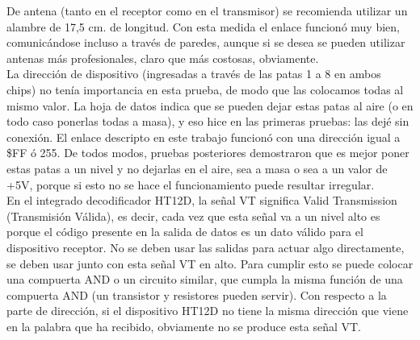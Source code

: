 \documentclass[a4paper,11pt]{article}
\begin{document}
De antena (tanto en el receptor como en el transmisor) se recomienda utilizar un alambre de 17,5 cm. de longitud. Con esta medida el enlace funcionó muy bien, comunicándose incluso a través de paredes, aunque si se desea se pueden utilizar antenas más profesionales, claro que más costosas, obviamente. \\

La dirección de dispositivo (ingresadas a través de las patas 1 a 8 en ambos chips) no tenía importancia en esta prueba, de modo que las colocamos todas al mismo valor. La hoja de datos indica que se pueden dejar estas patas al aire (o en todo caso ponerlas todas a masa), y eso hice en las primeras pruebas: las dejé sin conexión. El enlace descripto en este trabajo funcionó con una dirección igual a \$FF ó 255. De todos modos, pruebas posteriores demostraron que es mejor poner estas patas a un nivel y no dejarlas en el aire, sea a masa o sea a un valor de +5V, porque si esto no se hace el funcionamiento puede resultar irregular. \\
	
En el integrado decodificador HT12D, la señal VT significa Valid Transmission (Transmisión Válida), es decir, cada vez que esta señal va a un nivel alto es porque el código presente en la salida de datos es un dato válido para el dispositivo receptor. No se deben usar las salidas para actuar algo directamente, se deben usar junto con esta señal VT en alto. Para cumplir esto se puede colocar una compuerta AND o un circuito similar, que cumpla la misma función de una compuerta AND (un transistor y resistores pueden servir). Con respecto a la parte de dirección, si el dispositivo HT12D no tiene la misma dirección que viene en la palabra que ha recibido, obviamente no se produce esta señal VT.	
\end{document}
